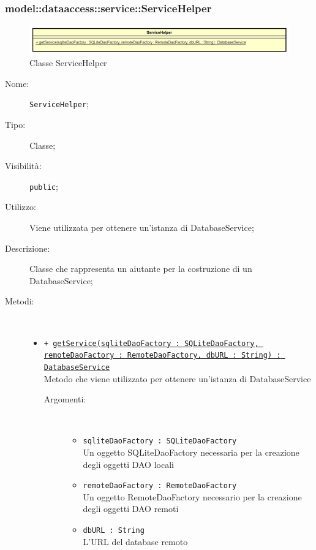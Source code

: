 \documentclass[../DefinizioneDiProdotto.tex]{subfiles}
\begin{document}
\subsubsection{model::dataaccess::service::ServiceHelper}

    \begin{figure}[H]
        \centering
        \includegraphics{img/ServiceHelper.png}
        \caption{Classe ServiceHelper}\label{fig:model::dataaccess::service::ServiceHelper} 
    \end{figure}
    \begin{description}
\item[Nome:] \texttt{ServiceHelper};
\item[Tipo:] Classe;
\item[Visibilità:] \texttt{public};
\item[Utilizzo:] Viene utilizzata per ottenere un'istanza di DatabaseService;
\item[Descrizione:] Classe che rappresenta un aiutante per la costruzione di un DatabaseService;
\item[Metodi:] \
\begin{itemize}
\item \texttt{+ \underline{getService(sqliteDaoFactory : SQLiteDaoFactory, remoteDaoFactory : RemoteDaoFactory, dbURL : String) : DatabaseService}}\\
Metodo che viene utilizzato per ottenere un'istanza di DatabaseService
 \begin{description}
\item[Argomenti:] \
\begin{itemize}
\item \texttt{sqliteDaoFactory : SQLiteDaoFactory}\\
Un oggetto SQLiteDaoFactory necessaria per la creazione degli oggetti DAO locali\item \texttt{remoteDaoFactory : RemoteDaoFactory}\\
Un oggetto RemoteDaoFactory necessario per la creazione degli oggetti DAO remoti\item \texttt{dbURL : String}\\
L'URL del database remoto\end{itemize}
\end{description}
\end{itemize}
\end{description}
\end{document}
